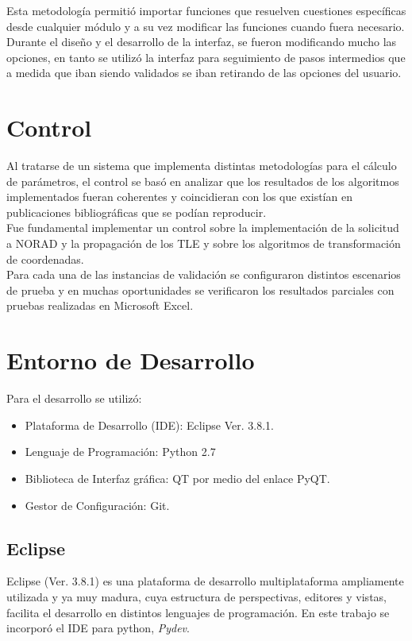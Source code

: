 Esta metodolog\'ia permiti\'o importar funciones que resuelven cuestiones espec\'ificas desde cualquier  m\'odulo y a su vez modificar las funciones cuando fuera necesario.\\

Durante el diseño y el desarrollo de la interfaz, se fueron modificando mucho las opciones, en tanto se utiliz\'o la interfaz para seguimiento de pasos intermedios que a medida que iban siendo validados se iban retirando de las opciones del usuario.\\

\section{Control}
Al tratarse de un sistema que implementa distintas metodolog\'ias para el c\'alculo de par\'ametros, el control se bas\'o en analizar que los resultados de los algoritmos implementados fueran coherentes y coincidieran con los que exist\'ian en publicaciones bibliogr\'aficas que se pod\'ian reproducir.\\

Fue fundamental implementar un control sobre la implementaci\'on de la solicitud a NORAD y la propagaci\'on de los TLE y sobre los algoritmos de transformaci\'on de coordenadas.\\

Para cada una de las instancias de validaci\'on se configuraron distintos escenarios de prueba y en muchas oportunidades se verificaron los resultados parciales con pruebas realizadas en Microsoft Excel.\\

\section{Entorno de Desarrollo}

Para el desarrollo se utiliz\'o:\\
\begin{itemize}
 \item Plataforma de Desarrollo (\ac{IDE}): Eclipse Ver. 3.8.1.
 \item Lenguaje de Programaci\'on: Python 2.7
 \item Biblioteca de Interfaz gr\'afica: QT por medio del enlace PyQT.
 \item Gestor de Configuraci\'on: Git.
\end{itemize}

\subsection*{Eclipse}
Eclipse (Ver. 3.8.1) es una plataforma de desarrollo multiplataforma ampliamente utilizada y ya muy madura, cuya estructura de perspectivas, editores y vistas, facilita el desarrollo en distintos lenguajes de programaci\'on. En este trabajo se incorpor\'o el IDE para python, {\it{Pydev}}.\\

